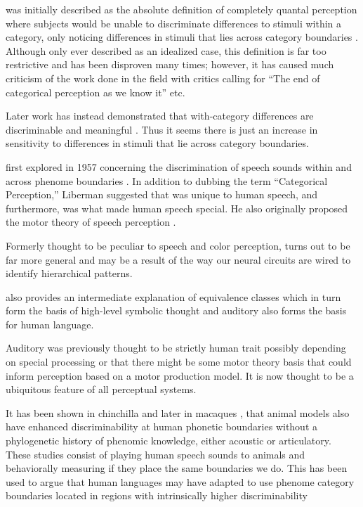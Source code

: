 \CP was initially described as the absolute definition of completely quantal perception where subjects would be unable to discriminate differences to stimuli within a category, only noticing differences in stimuli that lies across category boundaries \cite{liberman1957discrimination, Studdert1970motor}. Although only ever described as an idealized case, this definition is far too restrictive and has been disproven many times; however, it has caused much criticism of the work done in the \CP field with critics calling for ``The end of categorical perception as we know it'' \cite{schouten2003end} etc.

Later work has instead demonstrated that with-category differences are discriminable \cite{pisoni1974reaction,carney1977noncategorical,massaro1983categorical} and meaningful \cite{miller1997internal,mcmurray2002gradient,mcmurray2008gradient}. Thus it seems there is just an increase in sensitivity to differences in stimuli that lie across category boundaries.

\CP first explored in 1957 concerning the discrimination of speech sounds within and across phenome boundaries \cite{liberman1957discrimination}.  In addition to dubbing the term ``Categorical Perception,'' Liberman suggested that \CP was unique to human speech, and furthermore, was what made human speech special. He also originally proposed the motor theory of speech perception \cite{liberman1967perception}.

Formerly thought to be peculiar to speech and color perception, \CP turns out to be far more general and may be a result of the way our neural circuits are wired to identify hierarchical patterns.

\CP also provides an intermediate explanation of equivalence classes which in turn form the basis of high-level symbolic thought and auditory \CP also forms the basis for human language.

Auditory \CP was previously thought to be strictly human trait possibly depending on special processing or that there might be some motor theory basis that could inform perception based on a motor production model. It is now thought to be a ubiquitous feature of all perceptual systems.

It has been shown in chinchilla \cite{kuhl1975speech} and later in macaques \cite{kuhl1983enhanced}, that animal models also have enhanced discriminability at human phonetic boundaries without a phylogenetic history of phenomic knowledge, either acoustic or articulatory.
These studies consist of playing human speech sounds to animals and behaviorally measuring if they place the same boundaries we do.
This has been used to argue that human languages may have adapted to use phenome category boundaries located in regions with intrinsically higher discriminability \cite{stevens1981constraints,goldstone2010categorical}

